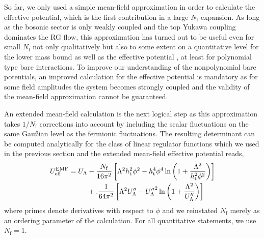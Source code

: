 \documentclass[twocolumn,aps,prd,showpacs,nofootinbib,superscriptaddress,preprintnumbers,floatfix,10pt]{revtex4-1}
\newcommand{\Nf}{N_{\mathrm{f}}}
\newcommand{\UL}{U_{\Lambda}}
\newcommand{\htop}{h_{\mathrm{t}}}
\newcommand{\UEMF}{U^{\mathrm{EMF}}_{\mathrm{eff}}}
\begin{document}
So far, we only used a simple mean-field approximation in order to calculate the effective potential, which is the first contribution in a large $\Nf$ expansion. As long as the bosonic sector is only weakly coupled and the top Yukawa coupling dominates the RG flow, this approximation has turned out to be useful even for small $\Nf$ not only qualitatively but also to some extent on a quantitative level for the lower mass bound \cite{Gies:2013fua} as well as the effective potential \cite{Borchardt:2016xju}, at least for polynomial type bare interactions. To improve our  understanding of the nonpolynomial bare potentials, an improved calculation for the effective potential is mandatory as for some field amplitudes the system becomes strongly coupled and the validity of the mean-field approximation cannot be guaranteed. 


An extended mean-field calculation is the next logical step as this approximation takes $1/\Nf$ corrections into account by including the scalar fluctuations on the same Gau{\ss}ian level as the fermionic fluctuations. The resulting determinant can be computed analytically for the class of linear regulator functions which we used in the previous section and the extended mean-field effective potential reads,
% 
\begin{align}
 \UEMF = U_{\Lambda} &- \frac{\Nf}{16\pi^{2}} \left[ \Lambda^{2} \htop^{2} \phi^{2} - \htop^{4}\phi^{4} \ln\left( 1 + \frac{\Lambda^{2}}{\htop^{2}\phi^{2}} \right) \right] \notag \\
 & + .\frac{1}{64\pi^{2}} \left[ \Lambda^{2} {\UL''} -{\UL''}^{2} \ln\left( 1 + \frac{\Lambda^{2}}{\UL''} \right) \right]
 \label{eq:EMF}
\end{align}
%
where primes denote derivatives with respect to $\phi$ and we reinstated $\Nf$ merely as an ordering parameter of the calculation. For all quantitative statements, we use ${\Nf=1}$.
\end{document}
